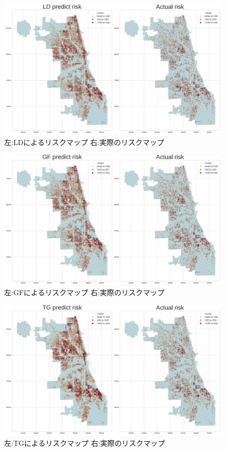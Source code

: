 \begin{figure}
  \centering %
  \includegraphics[scale=0.25]{./add-crime-timeseries-fig/LD_riskmap.png}
  \caption{左:LDによるリスクマップ 右:実際のリスクマップ}
  \label{fig:add-crime-timeseries-ld-risk}
\end{figure}

\begin{figure}
  \centering %
  \includegraphics[scale=0.25]{./add-crime-timeseries-fig/GF_riskmap.png}
  \caption{左:GFによるリスクマップ 右:実際のリスクマップ}
  \label{fig:add-crime-timeseries-gf-risk}
\end{figure}

\begin{figure}
  \centering %
  \includegraphics[scale=0.25]{./add-crime-timeseries-fig/TG_riskmap.png}
  \caption{左:TGによるリスクマップ 右:実際のリスクマップ}
  \label{fig:add-crime-timeseries-tg-risk}
\end{figure}

